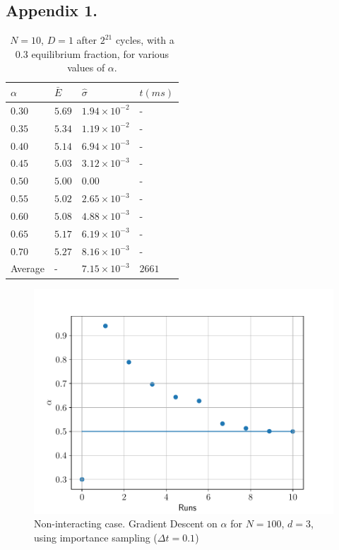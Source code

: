 \documentclass[%
oneside,                 %
final,                   %
10pt]{article}
\begin{document}
\begin{appendices}
\section{Appendix 1.} \label{APP_1}
\begin{table}[h!]
\begin{center}
\begin{tabular}{llll}
\hline
 $\alpha$ & $\bar{E} $ & $\hat \sigma$ & $t (ms)$ \\
\hline
$0.30$ 	  & $5.69$ & $1.94 \times 10^{-2}$ &  - \\  
$0.35$ 	  & $5.34$ & $1.19 \times 10^{-2}$ & -  \\  
$0.40$ 	  & $5.14$ & $6.94 \times 10^{-3}$ & -  \\  
$0.45$ 	  & $5.03$ & $3.12 \times 10^{-3}$ & -  \\  
$0.50$ 	  & $5.00$ & $0.00$ & -  \\  
$0.55$ 	  & $5.02$ & $2.65 \times 10^{-3}$ & -  \\  
$0.60$ 	  & $5.08$ & $4.88 \times 10^{-3}$ & -  \\  
$0.65$ 	  & $5.17$ & $6.19 \times 10^{-3}$ & -  \\  
$0.70$ 	  & $5.27$ & $8.16 \times 10^{-3}$ & -  \\  
Average   &    -	& $7.15 \times 10^{-3}$ & $2661$\\
\hline
\end{tabular}
\end{center}
\caption{$N=10$, $D=1$ after $2^{21}$ cycles, with a $0.3$ equilibrium fraction, for various values of $\alpha$.}
\label{table:N10D1}
\end{table}

\begin{figure}[!h]
        \centering 
         \includegraphics[scale=0.6]{../Results/GD.pdf} 
        \caption{Non-interacting case. Gradient Descent on $\alpha$ for $N=100$, $d=3$, using importance sampling ($\Delta t=0.1$)}
        \label{fig:GD}   
\end{figure}  



\end{appendices}
\end{document}
